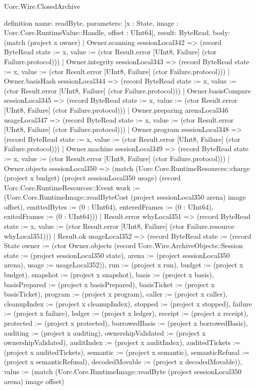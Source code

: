 \begin{lexlean}{Uorc.Wire.ClosedArchive}
\begin{semanticmodule}
definition{
  name: readByte,
  parameters: [x : State, image : Uorc.Core.RuntimeValue::Handle, offset : UInt64],
  result: ByteRead,
  body: (match (project x owner)
    | Owner.scanning sessionLocal342 => (record ByteRead {state := x, value := (ctor Result.error [UInt8, Failure] (ctor Failure.protocol))})
    | Owner.integrity sessionLocal343 => (record ByteRead {state := x, value := (ctor Result.error [UInt8, Failure] (ctor Failure.protocol))})
    | Owner.basisHash sessionLocal344 => (record ByteRead {state := x, value := (ctor Result.error [UInt8, Failure] (ctor Failure.protocol))})
    | Owner.basisCompare sessionLocal345 => (record ByteRead {state := x, value := (ctor Result.error [UInt8, Failure] (ctor Failure.protocol))})
    | Owner.preparing arenaLocal346 usageLocal347 => (record ByteRead {state := x, value := (ctor Result.error [UInt8, Failure] (ctor Failure.protocol))})
    | Owner.program sessionLocal348 => (record ByteRead {state := x, value := (ctor Result.error [UInt8, Failure] (ctor Failure.protocol))})
    | Owner.machine sessionLocal349 => (record ByteRead {state := x, value := (ctor Result.error [UInt8, Failure] (ctor Failure.protocol))})
    | Owner.objects sessionLocal350 => (match (Uorc.Core.RuntimeResources::charge (project x budget) (project sessionLocal350 usage) (record Uorc.Core.RuntimeResources::Event {work := (Uorc.Core.RuntimeImage::readByteCost (project sessionLocal350 arena) image offset), emittedBytes := (0 : UInt64), enteredFrames := (0 : UInt64), exitedFrames := (0 : UInt64)}))
      | Result.error whyLocal351 => (record ByteRead {state := x, value := (ctor Result.error [UInt8, Failure] (ctor Failure.resource whyLocal351))})
      | Result.ok usageLocal352 => (record ByteRead {state := (record State {owner := (ctor Owner.objects (record Uorc.Wire.ArchiveObjects::Session {state := (project sessionLocal350 state), arena := (project sessionLocal350 arena), usage := usageLocal352})), run := (project x run), budget := (project x budget), snapshot := (project x snapshot), basis := (project x basis), basisPrepared := (project x basisPrepared), basisTicket := (project x basisTicket), program := (project x program), caller := (project x caller), cleanupIndex := (project x cleanupIndex), stopped := (project x stopped), failure := (project x failure), ledger := (project x ledger), receipt := (project x receipt), protected := (project x protected), borrowedBasis := (project x borrowedBasis), auditing := (project x auditing), ownershipValidated := (project x ownershipValidated), auditIndex := (project x auditIndex), auditedTickets := (project x auditedTickets), semantic := (project x semantic), semanticRefusal := (project x semanticRefusal), decodedMovable := (project x decodedMovable)}), value := (match (Uorc.Core.RuntimeImage::readByte (project sessionLocal350 arena) image offset)
}}
\end{semanticmodule}
\end{lexlean}
